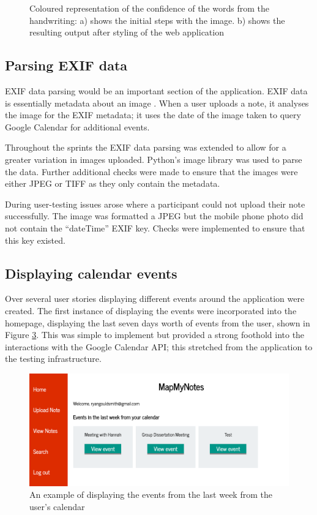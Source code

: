 {{{{{{{\begin{figure}[H]
\begin{subfigure}[h]{0.35\textwidth}
    \caption{}
    \label{fig:second_tesseract}
  \end{subfigure}
  \caption{Coloured representation of the confidence of the words from the handwriting: a) shows the initial steps with the image. b) shows the resulting output after styling of the web application}
  \label{fig:tesseract_colour}

\end{figure}

\subsection{Parsing EXIF data}
EXIF data parsing would be an important section of the application. EXIF data is essentially metadata about an image \cite{citeulike:14024991}. When a user uploads a note, it analyses the image for the EXIF metadata; it  uses the date of the image taken to query Google Calendar for additional events.

Throughout the sprints the EXIF data parsing was extended to allow for a greater variation in images uploaded. Python's image library \cite{citeulike:14024992} was used to parse the data. Further additional checks were made to ensure that the images were either JPEG or TIFF as they only contain the metadata.

During user-testing issues arose where a participant could not upload their note successfully. The image was formatted a JPEG but the mobile phone photo did not contain the ``dateTime'' EXIF key. Checks were implemented to ensure that this key existed.

\subsection{Displaying calendar events}
Over several user stories displaying different events around the application were created. The first instance of displaying the events were incorporated into the homepage, displaying the last seven days worth of events from the user, shown in Figure \ref{fig:seven_days}. This was simple to implement but provided a strong foothold into the interactions with the Google Calendar API; this stretched from the application to the testing infrastructure.

\begin{figure}[H]
  \centering
  \includegraphics[scale=0.5]{images/event_seven_day}
  \caption{An example of displaying the events from the last week from the user's calendar}
  \label{fig:seven_days}
\end{figure}

}}}}}}}
